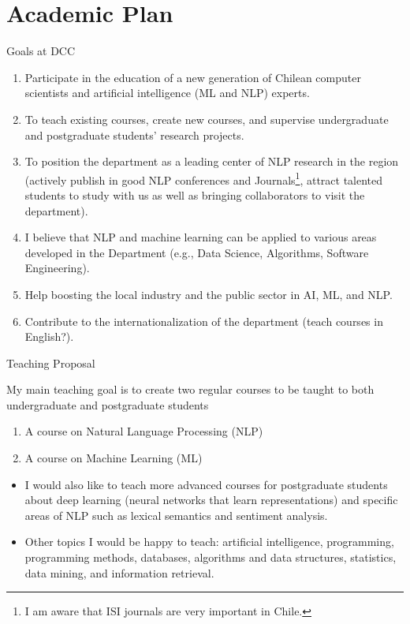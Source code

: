 \documentclass[handout]{beamer}
\begin{document}
\section{Academic Plan}


\begin{frame}{Goals at DCC}
\begin{scriptsize}
  \begin{enumerate}
\item Participate in the education of a new generation of Chilean computer scientists and artificial intelligence (ML and NLP) experts.
\item To teach existing courses, create new courses, and supervise undergraduate and postgraduate students' research projects. 
\item To position the department as a leading  center of NLP research in the region (actively publish in good NLP conferences and Journals\footnote{I am aware that ISI journals are very important in Chile.}, attract talented students to study with us as well as bringing collaborators to visit the department).
\item I believe that NLP and machine learning can be applied to various areas developed in the Department (e.g., Data Science, Algorithms, Software Engineering).
\item Help boosting the local industry and the public sector in AI, ML, and NLP.
\item Contribute to the internationalization of the department (teach courses in English?). 
  \end{enumerate} 
\end{scriptsize}

\end{frame}


\begin{frame}{Teaching Proposal}
\begin{scriptsize}
My main teaching goal is to create two regular courses to be taught to both undergraduate and postgraduate students
\begin{enumerate}
 \item A course on Natural Language Processing (NLP)
 \item A course  on Machine Learning (ML)
  \end{enumerate} 


\begin{itemize}
 \item I would also like to teach more advanced courses for postgraduate students about deep learning (neural networks that learn representations) and specific areas of NLP such as lexical semantics and sentiment analysis.
 \item Other topics I would be happy to teach: artificial intelligence, programming, programming methods, databases, algorithms and data structures, statistics, data mining, and information retrieval.  
\end{itemize}

\end{scriptsize}

\end{frame}
\end{document}
